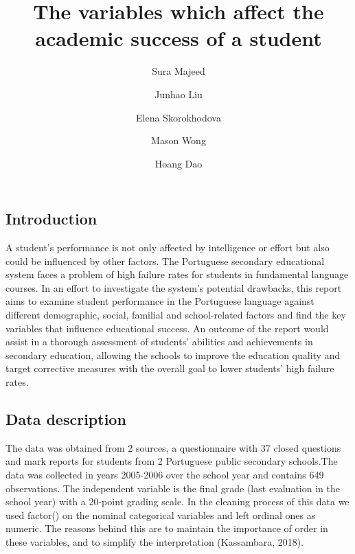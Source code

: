 \documentclass[letterpaper,9pt,twocolumn,twoside,]{pinp}
\title{The variables which affect the academic success of a student}
\author[]{Sura Majeed}
\author[]{Junhao Liu}
\author[]{Elena Skorokhodova}
\author[]{Mason Wong}
\author[]{Hoang Dao}
\affil[]{University of Sydney}
\begin{document}
\verticaladjustment{-2pt}

\maketitle
\thispagestyle{firststyle}



\hypertarget{introduction}{%
\subsection{Introduction}\label{introduction}}

A student's performance is not only affected by intelligence or effort
but also could be influenced by other factors. The Portuguese secondary
educational system faces a problem of high failure rates for students in
fundamental language courses. In an effort to investigate the system's
potential drawbacks, this report aims to examine student performance in
the Portuguese language against different demographic, social, familial
and school-related factors and find the key variables that influence
educational success. An outcome of the report would assist in a thorough
assessment of students' abilities and achievements in secondary
education, allowing the schools to improve the education quality and
target corrective measures with the overall goal to lower students' high
failure rates.

\hypertarget{data-description}{%
\subsection{Data description}\label{data-description}}

The data was obtained from 2 sources, a questionnaire with 37 closed
questions and mark reports for students from 2 Portuguese public
secondary schools.The data was collected in years 2005-2006 over the
school year and contains 649 observations. The independent variable is
the final grade (last evaluation in the school year) with a 20-point
grading scale. In the cleaning process of this data we used factor() on
the nominal categorical variables and left ordinal ones as numeric. The
reasons behind this are to maintain the importance of order in these
variables, and to simplify the interpretation (Kassambara, 2018).
\end{document}
